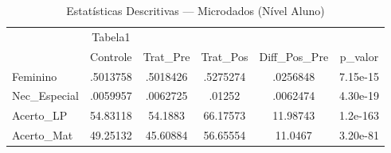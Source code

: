 \begin{table}[htbp]\centering
\caption{Estatísticas Descritivas --- Microdados (Nível Aluno)}
\begin{tabular}{l*{5}{c}}
\toprule
            &     Tabela1&            &            &            &            \\
            &    Controle&    Trat\_Pre&    Trat\_Pos&Diff\_Pos\_Pre&     p\_valor\\
\midrule
Feminino    &    .5013758&    .5018426&    .5275274&    .0256848&    7.15e-15\\
Nec\_Especial&    .0059957&    .0062725&      .01252&    .0062474&    4.30e-19\\
Acerto\_LP   &    54.83118&     54.1883&    66.17573&    11.98743&    1.2e-163\\
Acerto\_Mat  &    49.25132&    45.60884&    56.65554&     11.0467&    3.20e-81\\
\bottomrule
\end{tabular}
\end{table}
